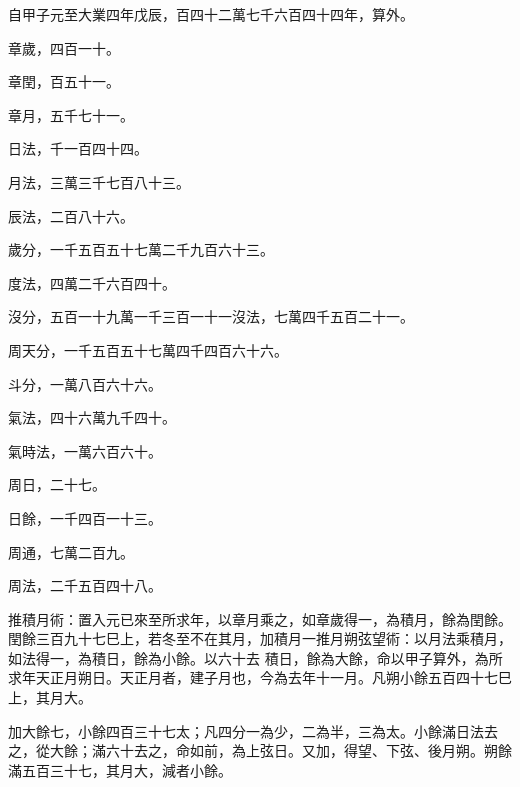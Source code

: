 \begin{pinyinscope}
 自甲子元至大業四年戊辰，百四十二萬七千六百四十四年，算外。



 章歲，四百一十。



 章閏，百五十一。



 章月，五千七十一。



 日法，千一百四十四。



 月法，三萬三千七百八十三。



 辰法，二百八十六。



 歲分，一千五百五十七萬二千九百六十三。



 度法，四萬二千六百四十。



 沒分，五百一十九萬一千三百一十一沒法，七萬四千五百二十一。



 周天分，一千五百五十七萬四千四百六十六。



 斗分，一萬八百六十六。



 氣法，四十六萬九千四十。



 氣時法，一萬六百六十。



 周日，二十七。



 日餘，一千四百一十三。



 周通，七萬二百九。



 周法，二千五百四十八。



 推積月術：置入元已來至所求年，以章月乘之，如章歲得一，為積月，餘為閏餘。閏餘三百九十七巳上，若冬至不在其月，加積月一推月朔弦望術：以月法乘積月，如法得一，為積日，餘為小餘。以六十去
 積日，餘為大餘，命以甲子算外，為所求年天正月朔日。天正月者，建子月也，今為去年十一月。凡朔小餘五百四十七巳上，其月大。



 加大餘七，小餘四百三十七太；凡四分一為少，二為半，三為太。小餘滿日法去之，從大餘；滿六十去之，命如前，為上弦日。又加，得望、下弦、後月朔。朔餘滿五百三十七，其月大，減者小餘。




\end{pinyinscope}
